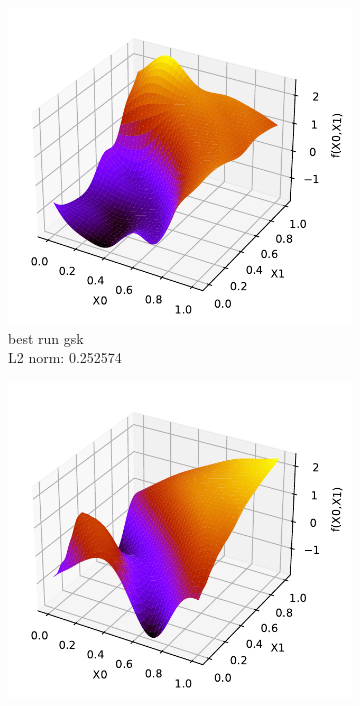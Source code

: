 \documentclass[./\jobname.tex]{subfiles}
\begin{document}
\begin{figure}[H]
	\centering
	\begin{subfigure}[b]{0.3333\linewidth}
		\centering
		\includegraphics[width=1\textwidth]{../../code/experiments/experiment_3/pde5_best_solution_non-adaptive.pdf}
		\caption{best run  \gls{gsk} \\L2 norm: 0.252574}
		\label{fig:pde5_ex3_worst_solution_non-adaptive}
	\end{subfigure}%
	\begin{subfigure}[b]{0.3333\linewidth}
		\centering
		\includegraphics[width=1\textwidth]{../../code/experiments/experiment_3/pde5_worst_solution_non-adaptive.pdf}

\end{subfigure}
\end{figure}
\end{document}
